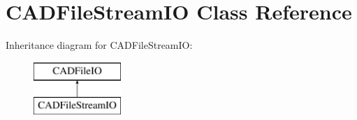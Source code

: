 \hypertarget{class_c_a_d_file_stream_i_o}{}\section{C\+A\+D\+File\+Stream\+IO Class Reference}
\label{class_c_a_d_file_stream_i_o}
Inheritance diagram for C\+A\+D\+File\+Stream\+IO\+:\begin{figure}[H]
\begin{center}
\leavevmode
\includegraphics[height=2.000000cm]{class_c_a_d_file_stream_i_o}
\end{center}
\end{figure}
